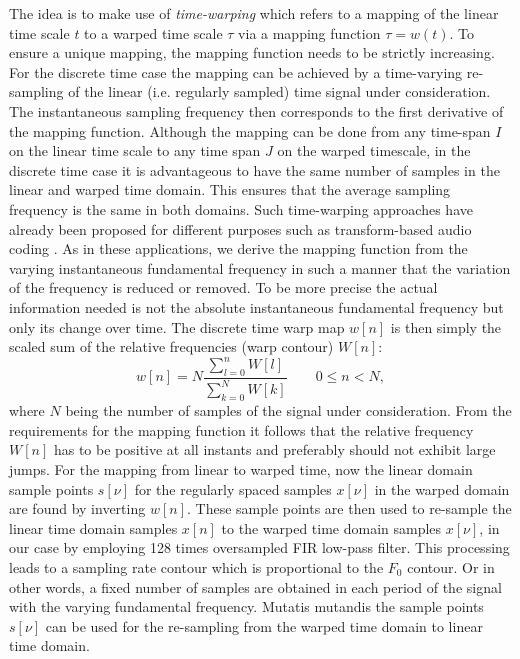The idea is to make use of \emph{time-warping} which refers to a mapping of the linear time scale $t$ to a warped time scale $\tau$ via a mapping function $\tau=w(t)$.
To ensure a unique mapping, the mapping function needs to be strictly increasing.
For the discrete time case the mapping can be achieved by a time-varying re-sampling of the linear (i.e. regularly sampled) time signal under consideration.
The instantaneous sampling frequency then corresponds to the first derivative of the mapping function. 
Although the mapping can be done from any time-span $I$ on the linear time scale to any time span $J$ on the warped timescale, in the discrete time case it is advantageous to have the same number of samples in the linear and warped time domain. 
This ensures that the average sampling frequency is the same in both domains. 
Such time-warping approaches have already been proposed for different purposes such as transform-based audio coding \cite{edler09}. 
As in these applications, we derive the mapping function from the varying instantaneous fundamental frequency in such a manner that the variation of the frequency is reduced or removed. 
To be more precise the actual information needed is not the absolute instantaneous fundamental frequency but only its change over time.
The discrete time warp map $w[n]$ is then simply the scaled sum of the relative frequencies (warp contour) $W[n]$:
\begin{equation}\label{eq:time_warp}
w[n]=N \frac{\sum^n_{l=0}{W[l]}}{\sum^N_{k=0}{W[k]}}  \qquad 0\leq n<N,
\end{equation}
where $N$ being the number of samples of the signal under consideration.
From the requirements for the mapping function it follows that the relative frequency $W[n]$ has to be positive at all instants and preferably should not exhibit large jumps.
For the mapping from linear to warped time, now the linear domain sample points $s[\nu]$ for the regularly spaced samples $x[\nu]$ in the warped domain are found by inverting $w[n]$. 
These sample points are then used to re-sample the linear time domain samples $x[n]$ to the warped time domain samples $x[\nu]$, in our case by employing 128 times oversampled FIR low-pass filter. 
This processing leads to a sampling rate contour which is proportional to the $F_0$ contour. 
Or in other words, a fixed number of samples are obtained in each period of the signal with the varying fundamental frequency. 
Mutatis mutandis the sample points $s[\nu]$ can be used for the re-sampling from the warped time domain to linear time domain. \\

